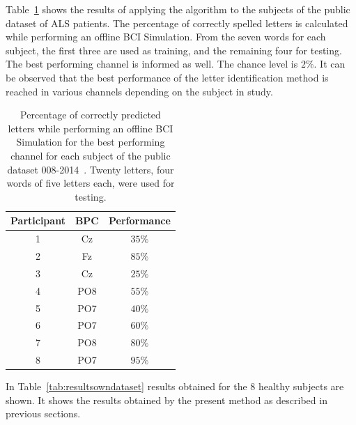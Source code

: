 \documentclass[entropy,article,submit,moreauthors,pdftex,10pt,a4paper]{mdpi}
\begin{document}

Table~\ref{tab:results} shows the results of applying the algorithm to the subjects of the public dataset of ALS patients. The percentage of correctly spelled letters is calculated while performing an offline BCI Simulation.  From the seven words for each subject, the first three are used as training, and the remaining four for testing.  The best performing channel is informed as well. The chance level is $2\%$.  It can be observed that the best performance of the letter identification method is reached in various channels depending on the subject in study. 

\begin{table}[H]
\caption{Percentage of correctly predicted letters while performing an offline BCI Simulation for the best performing channel for each subject of the public dataset 008-2014~\citep{Riccio2013}. Twenty letters, four words of five letters each, were used for testing. }
\centering
\begin{tabular}{ccc}
\toprule
\textbf{Participant}	&  \textbf{BPC}	& \textbf{Performance}\\
\midrule
1     &     Cz   &   $35\%$  \\
2     &     Fz   &   $85\%$  \\
3     &     Cz   &   $25\%$  \\
4     &     PO8 &   $55\%$  \\
5     &     PO7 &   $40\%$ \\
6     &     PO7 &   $60\%$  \\
7     &     PO8 &   $80\%$  \\
8     &     PO7 &   $95\%$ \\

\bottomrule
\end{tabular}
\label{tab:results}
\end{table}

In Table~\ref{tab:resultsowndataset} results obtained for the 8 healthy subjects are shown.   It shows the results obtained by the present method as described in previous sections.  

\end{document}
